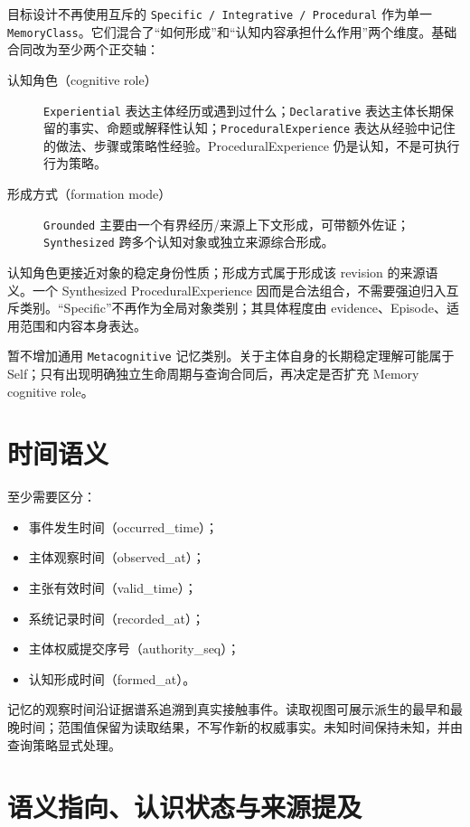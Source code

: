 目标设计不再使用互斥的 \texttt{Specific / Integrative / Procedural} 作为单一 \texttt{MemoryClass}。它们混合了“如何形成”和“认知内容承担什么作用”两个维度。基础合同改为至少两个正交轴：

\begin{description}
\item[认知角色（cognitive role）] \texttt{Experiential} 表达主体经历或遇到过什么；\texttt{Declarative} 表达主体长期保留的事实、命题或解释性认知；\texttt{ProceduralExperience} 表达从经验中记住的做法、步骤或策略性经验。ProceduralExperience 仍是认知，不是可执行行为策略。
\item[形成方式（formation mode）] \texttt{Grounded} 主要由一个有界经历/来源上下文形成，可带额外佐证；\texttt{Synthesized} 跨多个认知对象或独立来源综合形成。
\end{description}

认知角色更接近对象的稳定身份性质；形成方式属于形成该 revision 的来源语义。一个 Synthesized ProceduralExperience 因而是合法组合，不需要强迫归入互斥类别。“Specific”不再作为全局对象类别；其具体程度由 evidence、Episode、适用范围和内容本身表达。

暂不增加通用 \texttt{Metacognitive} 记忆类别。关于主体自身的长期稳定理解可能属于 Self；只有出现明确独立生命周期与查询合同后，再决定是否扩充 Memory cognitive role。

\section{时间语义}

至少需要区分：

\begin{itemize}
\item 事件发生时间（occurred\allowbreak\_time）；
\item 主体观察时间（observed\allowbreak\_at）；
\item 主张有效时间（valid\allowbreak\_time）；
\item 系统记录时间（recorded\allowbreak\_at）；
\item 主体权威提交序号（authority\allowbreak\_seq）；
\item 认知形成时间（formed\allowbreak\_at）。
\end{itemize}

记忆的观察时间沿证据谱系追溯到真实接触事件。读取视图可展示派生的最早和最晚时间；范围值保留为读取结果，不写作新的权威事实。未知时间保持未知，并由查询策略显式处理。

\section{语义指向、认识状态与来源提及}

